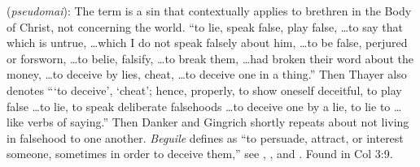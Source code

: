 \item[Beguile,]

(\textit{pseudomai}):
The term is a sin that contextually applies to brethren in the Body of Christ, not concerning the world. ``to lie, speak false, play false, \ldots to say that which is untrue, \ldots which I do not speak falsely about him, \ldots to be false, perjured or forsworn, \ldots to belie, falsify, \ldots to break them, \ldots had broken their word about the money, \ldots to deceive by lies, cheat, \ldots to deceive one in a thing.'' Then Thayer also denotes ```to deceive', `cheat'; hence, properly, to show oneself deceitful, to play false \ldots to lie, to speak deliberate falsehoods \ldots to deceive one by a lie, to lie to \ldots like verbs of saying.'' Then Danker and Gingrich shortly repeats about not living in falsehood to one another. \emph{Beguile} defines as ``to persuade, attract, or interest someone, sometimes in order to deceive them,'' see , , and .
Found in Col 3:9.

